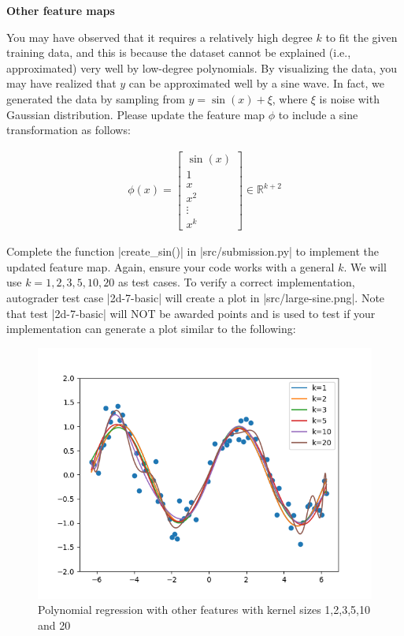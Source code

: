 \item {} {\bf Other feature maps}

You may have observed that it requires a relatively high degree $k$ to fit the given training data, and this is because the dataset cannot be explained (i.e., approximated) very well by low-degree polynomials. By visualizing the data, you may have realized that $y$ can be approximated well by a sine wave. In fact, we generated the data by sampling from $y = \sin(x) + \xi$, where $\xi$ is noise with Gaussian distribution. Please update the feature map $\phi$ to include a sine transformation as follows:

\begin{align}
\phi(x) = \left[\begin{array}{c} \sin(x) \\ 1 \\ x \\ x^2\\ \vdots \\x^k\end{array}\right]\in \mathbb{R}^{k+2} \label{eqn:feature-sine}
\end{align}

Complete the function |create_sin()| in |src/submission.py| to implement the updated feature map.  Again, ensure your code  works with a general $k$.  We will use $k=1,2,3,5,10,20$ as test cases. To verify a correct implementation, autograder test case |2d-7-basic| will create a plot in |src/large-sine.png|. Note that test |2d-7-basic| will NOT be awarded points and is used to test if your implementation can generate a plot similar to the following:

\begin{figure}[H]
  \centering
  \includegraphics[width=0.65\linewidth]{02-featuremaps/large-sine.png}
  \centering
\caption{Polynomial regression with other features with kernel sizes 1,2,3,5,10 and 20}
\end{figure}
